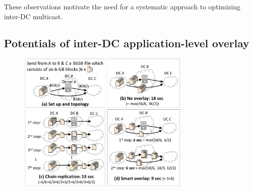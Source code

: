 \vspace{0.1cm}
These observations motivate the need for a systematic approach
to optimizing inter-DC multicast.


%
%
%
%

\subsection{Potentials of inter-DC application-level overlay}
\label{subsec:motivation:case-for}


\begin{figure}[t]
\centering
\includegraphics[width=84mm]{images/example-junchen.pdf}
\vspace{-0.4cm}
\label{fig:case:example}
\vspace{-0.4cm}
\end{figure}

